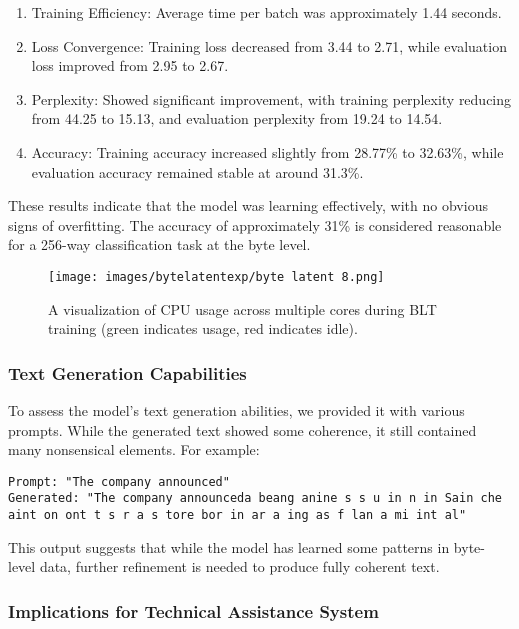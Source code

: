 \documentclass[a4paper, 11pt, twoside, openright]{report}
\begin{document}
\begin{enumerate}[label=\arabic*.]
    \item Training Efficiency: Average time per batch was approximately 1.44 seconds.
    \item Loss Convergence: Training loss decreased from 3.44 to 2.71, while evaluation loss improved from 2.95 to 2.67.
    \item Perplexity: Showed significant improvement, with training perplexity reducing from 44.25 to 15.13, and evaluation perplexity from 19.24 to 14.54.
    \item Accuracy: Training accuracy increased slightly from 28.77\% to 32.63\%, while evaluation accuracy remained stable at around 31.3\%.
\end{enumerate}

These results indicate that the model was learning effectively, with no obvious signs of overfitting. The accuracy of approximately 31\% is considered reasonable for a 256-way classification task at the byte level.

\begin{figure}[h!]
\centering
\texttt{[image: images/bytelatentexp/byte latent 8.png]}
\caption{A visualization of CPU usage across multiple cores during BLT training (green indicates usage, red indicates idle).}
\label{fig:cpu_usage}
\end{figure}

\subsubsection{Text Generation Capabilities}

To assess the model's text generation abilities, we provided it with various prompts. While the generated text showed some coherence, it still contained many nonsensical elements. For example:

\begin{verbatim}
Prompt: "The company announced"
Generated: "The company announceda beang anine s s u in n in Sain che
aint on ont t s r a s tore bor in ar a ing as f lan a mi int al"
\end{verbatim}

This output suggests that while the model has learned some patterns in byte-level data, further refinement is needed to produce fully coherent text.

\subsubsection{Implications for Technical Assistance System}
\end{document}
